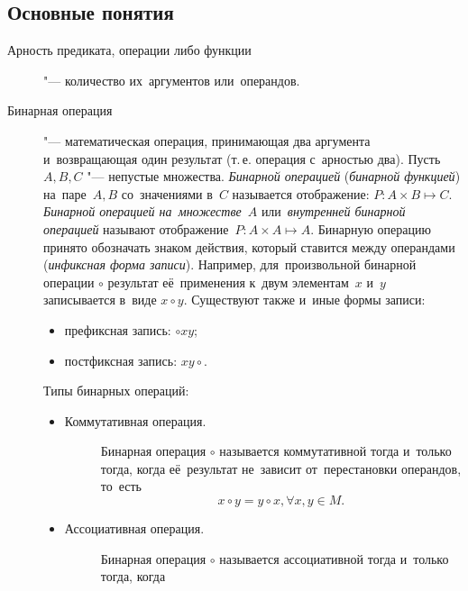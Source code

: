 \documentclass[]{scrartcl}
\begin{document}
\subsection{Основные понятия}
\begin{description}
	\item[Арность предиката, операции либо функции] "--- количество их~аргументов или~операндов. 
	\item[Бинарная операция] "--- математическая операция, принимающая два аргумента и~возвращающая один результат (т.\,е. операция с~арностью два). Пусть ${\textstyle A,B,C}$ "--- непустые множества. \emph{Бинарной операцией} (\emph{бинарной функцией}) на~паре~${\textstyle A,B}$ со~значениями в~${\textstyle C}$ называется отображение: ${\textstyle P:A \times B \mapsto C}$. \emph{Бинарной операцией на~множестве}~${\textstyle A}$ или~\emph{внутренней бинарной операцией} называют отображение~${\textstyle P:A \times A \mapsto A}$. Бинарную операцию принято обозначать знаком действия, который ставится между операндами (\emph{инфиксная форма записи}). Например, для~произвольной бинарной операции ${\textstyle \circ }$ результат её~применения к~двум элементам~${\textstyle x}$ и~${\textstyle y}$ записывается в~виде ${\textstyle x\circ y}$. Существуют также и~иные формы записи:
	\begin{itemize}
		\item префиксная запись: ${\textstyle \circ xy}$;
		\item постфиксная запись: ${\textstyle xy\circ}$.
	\end{itemize}
Типы бинарных операций:
\begin{itemize}
	\item
	\begin{description}
		\item[Коммутативная операция.] Бинарная операция ${\textstyle \circ}$ называется коммутативной тогда и~только тогда, когда её~результат не~зависит от~перестановки операндов, то~есть
		\begin{equation}\label{eq:commutativity-1}
		x \circ y = y \circ x, \forall x,y \in M.
		\end{equation}
	\end{description}
	\item
	\begin{description}
		\item[Ассоциативная операция.] Бинарная операция ${\textstyle \circ}$ называется ассоциативной тогда и~только тогда, когда
		\begin{equation}\label{eq:Associativity}

\end{equation}
\end{description}
\end{itemize}
\end{description}
\end{document}
